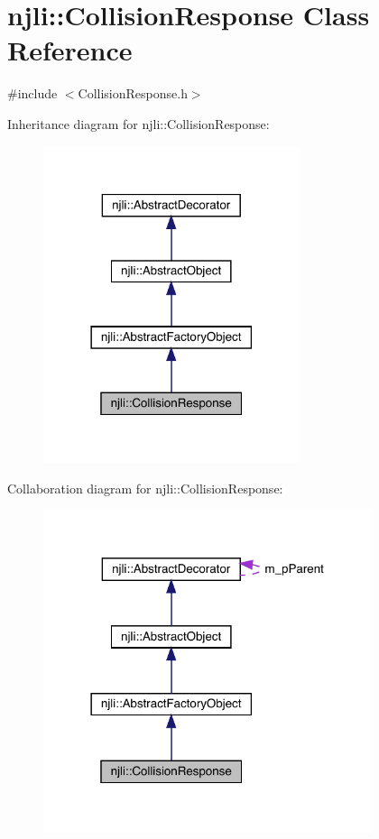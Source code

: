 \hypertarget{classnjli_1_1_collision_response}{}\section{njli\+:\+:Collision\+Response Class Reference}
\label{classnjli_1_1_collision_response}


{\ttfamily \#include $<$Collision\+Response.\+h$>$}



Inheritance diagram for njli\+:\+:Collision\+Response\+:\nopagebreak
\begin{figure}[H]
\begin{center}
\leavevmode
\includegraphics[width=213pt]{classnjli_1_1_collision_response__inherit__graph}
\end{center}
\end{figure}


Collaboration diagram for njli\+:\+:Collision\+Response\+:\nopagebreak
\begin{figure}[H]
\begin{center}
\leavevmode
\includegraphics[width=273pt]{classnjli_1_1_collision_response__coll__graph}
\end{center}
\end{figure}
